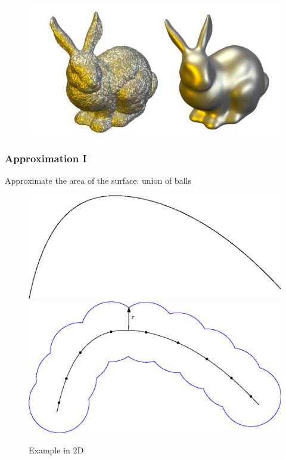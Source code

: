 \documentclass{beamer}
\begin{document}
\begin{frame}
\begin{figure}
        \includegraphics[scale=0.2]{img/mean-curvature-flow-rabbit}
    \end{figure}
\end{frame}

\begin{frame}
    \frametitle{Approximation I}

    Approximate the area of the surface: union of balls

    \begin{figure}
        \centering
        \includegraphics[scale=0.45]{img/curve-2d}
        \hspace{0.5cm}
        \includegraphics[scale=0.4]{img/curve-2d-offset}
        \caption*{Example in 2D}
    \end{figure}
\end{frame}
\end{document}
